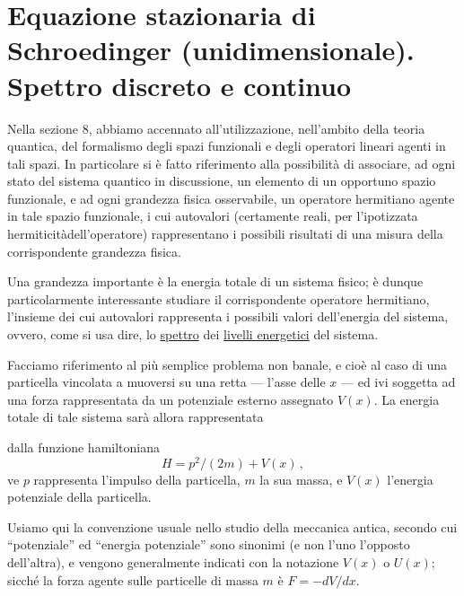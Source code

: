 \documentclass[11pt, a4paper]{book}
\numberwithin{equation}{section}
\begin{document}
\section{Equazione stazionaria di Schroedinger (unidimensionale). Spettro
discreto e continuo}

Nella sezione 8, abbiamo accennato all'utilizzazione, nell'ambito
della teoria quantica, del formalismo degli spazi funzionali e degli operatori lineari agenti in tali spazi. In particolare si è fatto riferimento
alla possibilità di associare, ad ogni stato del sistema quantico in discussione, un elemento di un opportuno spazio funzionale, e ad ogni
grandezza fisica osservabile, un operatore hermitiano agente in tale
spazio funzionale, i cui autovalori (certamente reali, per l'ipotizzata
hermiticitàdell'operatore) rappresentano i possibili risultati di una misura della corrispondente grandezza fisica.

Una grandezza importante è la energia totale di un sistema fisico;
è dunque particolarmente interessante studiare il corrispondente operatore
hermitiano, l'insieme dei cui autovalori rappresenta i possibili valori
dell'energia del sistema, ovvero, come si usa dire, lo \underline{spettro} dei \underline{livelli
energetici} del sistema.

Facciamo riferimento al più semplice problema non banale, e cioè
al caso di una particella vincolata a muoversi su una retta --- l'asse delle $x$ --- ed ivi soggetta ad una forza rappresentata da un potenziale esterno
assegnato $V(x)$. La energia totale di tale sistema sarà allora rappresentata


dalla funzione hamiltoniana
\begin{equation}
H = p^2/(2m) + V(x) \,, \tag{1}
\end{equation}
ve $p$ rappresenta l'impulso della particella, $m$ la sua massa, e $V(x)$
l'energia potenziale della particella.

Usiamo qui la convenzione usuale nello studio della meccanica
antica, secondo cui ``potenziale'' ed ``energia potenziale'' sono sinonimi
(e non l'uno l'opposto dell'altra), e vengono generalmente indicati
con la notazione $V(x)$ o $U(x)$; sicché la forza agente sulle particelle di
massa $m$ è $F = -dV/dx$.
\end{document}
